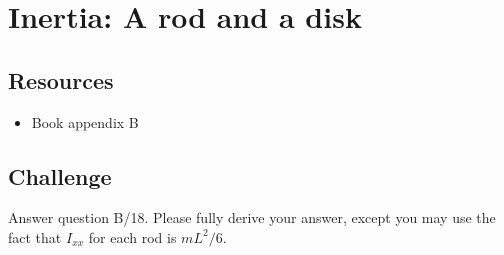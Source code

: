 \newpage
\section{Inertia: A rod and a disk}

\subsection*{Resources}
\begin{itemize}
    \item Book appendix B
\end{itemize}

\subsection*{Challenge}
Answer question B/18. Please fully derive your answer, except you may use the fact that $I_{xx}$ for each rod is $m L^2/6$.
\fi
